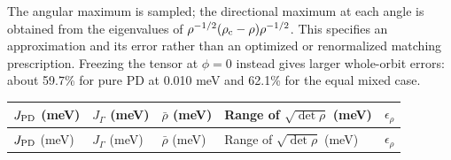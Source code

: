 The angular maximum is sampled; the directional maximum at each angle is
obtained from the eigenvalues of
\(\rho^{-1/2}(\rho_{\rm c}-\rho)\rho^{-1/2}\). This specifies an
approximation and its error rather than an optimized or renormalized
matching prescription. Freezing the tensor at \(\phi=0\) instead gives
larger whole-orbit errors: about 59.7\% for pure PD at 0.010 meV and
62.1\% for the equal mixed case.

\begin{longtable}[]{@{}
  >{\raggedleft\arraybackslash}p{}
  >{\raggedleft\arraybackslash}p{}
  >{\raggedleft\arraybackslash}p{}
  >{\raggedright\arraybackslash}p{}
  >{\raggedleft\arraybackslash}p{}@{}}
\toprule\noalign{}
\begin{minipage}[b]{\linewidth}\raggedleft
\(J_{\rm PD}\) (meV)
\end{minipage} & \begin{minipage}[b]{\linewidth}\raggedleft
\(J_\Gamma\) (meV)
\end{minipage} & \begin{minipage}[b]{\linewidth}\raggedleft
\(\bar\rho\) (meV)
\end{minipage} & \begin{minipage}[b]{\linewidth}\raggedright
Range of \(\sqrt{\det\rho}\) (meV)
\end{minipage} & \begin{minipage}[b]{\linewidth}\raggedleft
\(\epsilon_\rho\)
\end{minipage} \\
\midrule\noalign{}
\endfirsthead
\toprule\noalign{}
\begin{minipage}[b]{\linewidth}\raggedleft
\(J_{\rm PD}\) (meV)
\end{minipage} & \begin{minipage}[b]{\linewidth}\raggedleft
\(J_\Gamma\) (meV)
\end{minipage} & \begin{minipage}[b]{\linewidth}\raggedleft
\(\bar\rho\) (meV)
\end{minipage} & \begin{minipage}[b]{\linewidth}\raggedright
Range of \(\sqrt{\det\rho}\) (meV)
\end{minipage} & \begin{minipage}[b]{\linewidth}\raggedleft
\(\epsilon_\rho\)
\end{minipage} \\

\end{longtable}
